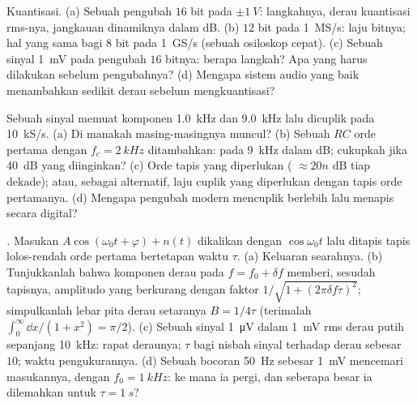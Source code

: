 \begin{exercise}[$\star\star$]\label{exo:b2:feedback-oscillators:8}
Kuantisasi. (a) Sebuah pengubah $16$ bit pada $\pm\qty{1}{V}$: langkahnya, derau
kuantisasi rms-nya, jangkauan dinamiknya dalam dB. (b) $12$ bit pada
\qty{1}{MS/s}: laju bitnya; hal yang sama bagi $8$ bit pada \qty{1}{GS/s} (sebuah osiloskop
cepat). (c) Sebuah sinyal \qty{1}{mV} pada pengubah $16$ bitnya: berapa
langkah? Apa yang harus dilakukan sebelum pengubahnya? (d) Mengapa sistem audio
yang baik menambahkan sedikit derau sebelum mengkuantisasi?
\end{exercise}

\begin{exercise}[$\star\star$]\label{exo:b2:feedback-oscillators:9}
Sebuah sinyal memuat komponen \qty{1.0}{kHz} dan \qty{9.0}{kHz} lalu
dicuplik pada \qty{10}{kS/s}. (a) Di manakah masing-masingnya muncul? (b) Sebuah
 $RC$ orde pertama dengan $f_c = \qty{2}{kHz}$ ditambahkan:
 pada \qty{9}{kHz} dalam dB; cukupkah jika \qty{40}{dB} yang diinginkan? (c)
Orde tapis yang diperlukan ( $\approx 20n$ dB tiap dekade); atau,
sebagai alternatif, laju cuplik yang diperlukan dengan tapis orde pertamanya. (d)
Mengapa pengubah modern mencuplik berlebih lalu menapis secara digital?
\end{exercise}

\begin{exercise}[$\star\star\star$]\label{exo:b2:feedback-oscillators:10}
\emph{.} Masukan $A\cos(\omega_0t + \varphi) + n(t)$ dikalikan dengan $\cos\omega_0t$
lalu ditapis tapis lolos-rendah orde pertama bertetapan waktu $\tau$. (a) Keluaran
searahnya. (b) Tunjukkanlah bahwa komponen derau pada $f = f_0 + \delta f$ memberi, sesudah
tapisnya, amplitudo yang berkurang dengan faktor $1/\sqrt{1 + (2\pi\delta f\tau)^2}$;
simpulkanlah lebar pita derau setaranya $B = 1/4\tau$ (terimalah $\int_0^\infty
\dd x/(1 + x^2) = \pi/2$). (c) Sebuah sinyal \qty{1}{\micro V} dalam \qty{1}{mV} rms
derau putih sepanjang \qty{10}{kHz}: rapat deraunya; $\tau$ bagi nisbah sinyal
terhadap derau sebesar $10$; waktu pengukurannya. (d) Sebuah bocoran \qty{50}{Hz} sebesar \qty{1}{mV}
mencemari masukannya, dengan $f_0 = \qty{1}{kHz}$: ke mana ia pergi, dan
seberapa besar ia dilemahkan untuk $\tau = \qty{1}{s}$?
\end{exercise}

